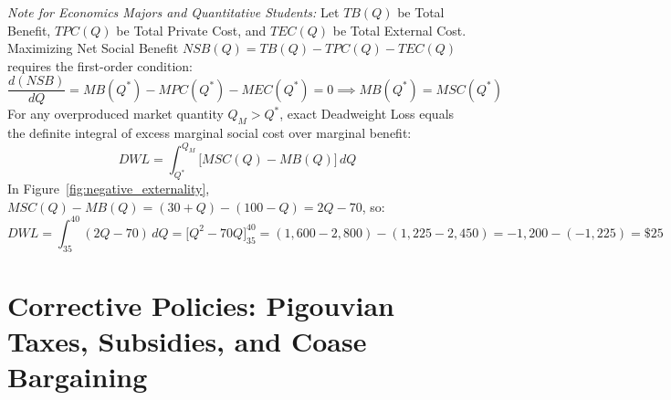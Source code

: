 \documentclass[11pt,letterpaper]{article}
\begin{document}
\begin{tcolorbox}[colback=CourseBlue!5!white,colframe=SlateBlue,title=\textbf{Optional Advanced Section: Calculus of Social Surplus and Deadweight Loss}]
\small
\emph{Note for Economics Majors and Quantitative Students:}
Let $TB(Q)$ be Total Benefit, $TPC(Q)$ be Total Private Cost, and $TEC(Q)$ be Total External Cost. Maximizing Net Social Benefit $NSB(Q) = TB(Q) - TPC(Q) - TEC(Q)$ requires the first-order condition:
\[
\frac{d(NSB)}{dQ} = MB(Q^*) - MPC(Q^*) - MEC(Q^*) = 0 \implies MB(Q^*) = MSC(Q^*)
\]
For any overproduced market quantity $Q_M > Q^*$, exact Deadweight Loss equals the definite integral of excess marginal social cost over marginal benefit:
\[
DWL = \int_{Q^*}^{Q_M} \bigl[MSC(Q) - MB(Q)\bigr]\,dQ
\]
In Figure~\ref{fig:negative_externality}, $MSC(Q) - MB(Q) = (30 + Q) - (100 - Q) = 2Q - 70$, so:
\[
DWL = \int_{35}^{40} (2Q - 70)\,dQ = \bigl[Q^2 - 70Q\bigr]_{35}^{40} = (1{,}600 - 2{,}800) - (1{,}225 - 2{,}450) = -1{,}200 - (-1{,}225) = \$25
\]
\end{tcolorbox}

\section{Corrective Policies: Pigouvian Taxes, Subsidies, and Coase Bargaining}
\end{document}
